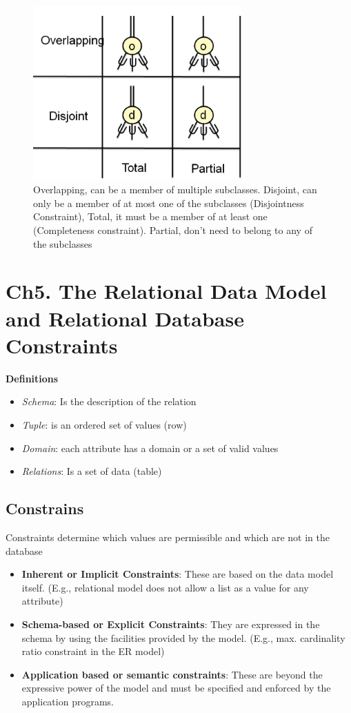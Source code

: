 \begin{figure}[!h]
    \centering
    \includegraphics[width=8cm]{image/constraints_specialization-generalization.png}
    \caption{Overlapping, can be a member of multiple subclasses. Disjoint, can only be a member of at most one of the subclasses (Disjointness Constraint),  Total, it must be a member of at least one (Completeness constraint). Partial, don't need to belong to any of the subclasses}
\end{figure}


\newpage
\section{Ch5. The Relational Data Model and Relational Database Constraints}
\noindent\textbf{Definitions}
\begin{itemize}
    \item \textit{Schema}: Is the description of the relation
    \item \textit{Tuple}: is an ordered set of values (row)
    \item \textit{Domain}: each attribute has a domain or a set of valid values
    \item \textit{Relations}: Is a set of data (table)
\end{itemize}

\subsection{Constrains}
Constraints determine which values are permissible and 
which are not in the database
\begin{itemize}
    \item \textbf{Inherent or Implicit Constraints}: These are based on the data model itself. (E.g., relational model does not allow a list as a value for any attribute)
    \item \textbf{Schema-based or Explicit Constraints}: They are expressed in the schema by using the facilities provided by the model. (E.g., max. cardinality ratio constraint in the ER model) 
    \item \textbf{Application based or semantic constraints}: These are beyond the expressive power of the model and must be specified and enforced by the application programs. 
\end{itemize}

